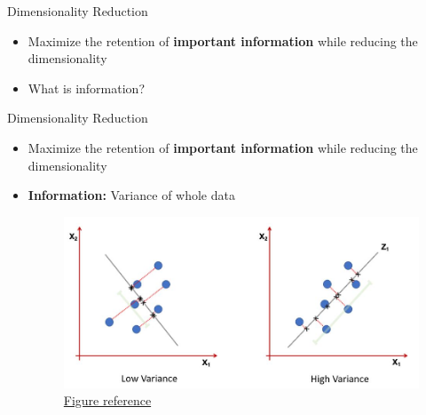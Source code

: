 \documentclass[serif, aspectratio=169]{beamer}
\begin{document}
\begin{frame}{Dimensionality Reduction}
    \begin{itemize}
        \item Maximize the retention of  \textbf{important information} while reducing the dimensionality
        
        \item What is information?
    \end{itemize}
\end{frame}

\begin{frame}{Dimensionality Reduction}
    \begin{itemize}
        \item Maximize the retention of  \textbf{important information} while reducing the dimensionality
        \item \textbf{Information:} Variance of whole data
        \begin{figure}[htpb]
                \begin{center}
                    \includegraphics[keepaspectratio, scale=0.5]{pic/dim_red_var.JPG}
                    \caption{\href{https://bookdown.org/tpinto_home/Unsupervised-learning/principal-components-analysis.html}{Figure reference}}
                \end{center}
        \end{figure}
    \end{itemize}

\end{frame}
\end{document}
